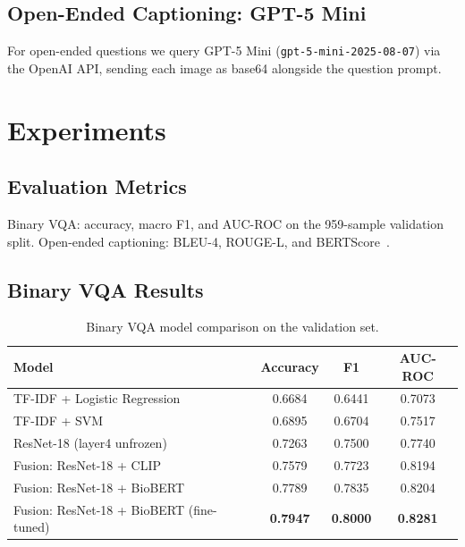\documentclass{article}
\begin{document}
\subsection{Open-Ended Captioning: GPT-5 Mini}
\label{sec:vlm}
For open-ended questions we query GPT-5 Mini (\texttt{gpt-5-mini-2025-08-07})
via the OpenAI API, sending each image as base64 alongside the question prompt.


\section{Experiments}
\label{sec:experiments}

\subsection{Evaluation Metrics}
Binary VQA: accuracy, macro F1, and AUC-ROC on the 959-sample validation split.
Open-ended captioning: BLEU-4, ROUGE-L, and
BERTScore~\cite{zhang2020bertscore}.

\subsection{Binary VQA Results}

\begin{table}[h]
  \caption{Binary VQA model comparison on the validation set.}
  \label{tab:binary-results}
  \centering
  \begin{tabular}{lccc}
    \toprule
    Model & Accuracy & F1 & AUC-ROC \\
    \midrule
    TF-IDF + Logistic Regression             & 0.6684 & 0.6441 & 0.7073 \\
    TF-IDF + SVM                             & 0.6895 & 0.6704 & 0.7517 \\
    ResNet-18 (layer4 unfrozen)              & 0.7263 & 0.7500 & 0.7740 \\
    Fusion: ResNet-18 + CLIP                 & 0.7579 & 0.7723 & 0.8194 \\
    Fusion: ResNet-18 + BioBERT              & 0.7789 & 0.7835 & 0.8204 \\
    Fusion: ResNet-18 + BioBERT (fine-tuned) & \textbf{0.7947} & \textbf{0.8000} & \textbf{0.8281} \\
    \bottomrule
  \end{tabular}
\end{table}
\end{document}
